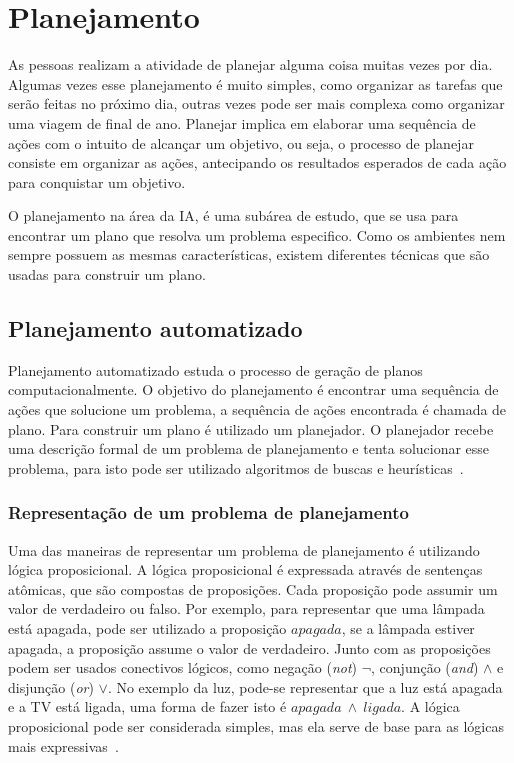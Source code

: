 \chapter{Planejamento}
\label{chap:planejamento}

As pessoas realizam a atividade de planejar alguma coisa muitas vezes por dia.
Algumas vezes esse planejamento é muito simples, como organizar as tarefas que serão feitas no próximo dia, outras vezes pode ser mais complexa como organizar uma viagem de final de ano. Planejar implica em elaborar uma sequência de ações com o intuito de alcançar um objetivo, ou seja, o processo de planejar consiste em organizar as ações, antecipando os resultados esperados de cada ação para conquistar um objetivo. 

O planejamento na área da IA, é uma subárea de estudo, que se usa para encontrar um plano que resolva um problema especifico. Como os ambientes nem sempre possuem as mesmas características, existem diferentes técnicas que são usadas para construir um plano.

\section{Planejamento automatizado}
\label{sec:classicalPlanning}

Planejamento automatizado estuda o processo de geração de planos computacionalmente. O objetivo do planejamento é encontrar uma sequência de ações que solucione um problema, a sequência de ações encontrada é chamada de plano. Para construir um plano é utilizado um planejador. O planejador recebe uma descrição formal de um problema de planejamento e tenta solucionar esse problema, para isto pode ser utilizado algoritmos de buscas e heurísticas~\cite{ghallab2004automated}\cite[Capítulo 10]{intelligence2003modern}.

\subsection{Representação de um problema de planejamento}
\label{subsec:classicalPlanningRep}

Uma das maneiras de representar um problema de planejamento é utilizando lógica proposicional.
A lógica proposicional é expressada através de sentenças atômicas, que são compostas de proposições. 
Cada proposição pode assumir um valor de verdadeiro ou falso. 
Por exemplo, para representar que uma lâmpada está apagada, pode ser utilizado a proposição $apagada$, se a lâmpada estiver apagada, a proposição assume o valor de verdadeiro. Junto com as proposições podem ser usados conectivos lógicos, como negação (\textit{not}) $\neg$, conjunção (\textit{and}) $\wedge$ e disjunção (\textit{or}) $\vee$. 
No exemplo da luz, pode-se representar que a luz está apagada e a TV está ligada, uma forma de fazer isto é $apagada~ \wedge~ ligada$. 
A lógica proposicional pode ser considerada simples, mas ela serve de base para as lógicas mais expressivas~\cite[Capítulo 10]{intelligence2003modern}. 

